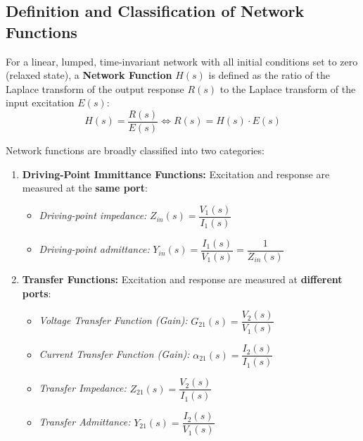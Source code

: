\documentclass[12pt,a4paper]{article}
\begin{document}
\subsection{Definition and Classification of Network Functions}

\begin{tcolorbox}[defbox, title={\textbf{Network Function Definition}}]
For a linear, lumped, time-invariant network with all initial conditions set to zero (relaxed state), a \textbf{Network Function} $H(s)$ is defined as the ratio of the Laplace transform of the output response $R(s)$ to the Laplace transform of the input excitation $E(s)$:
\begin{equation}
  H(s) = \frac{R(s)}{E(s)} \iff R(s) = H(s) \cdot E(s)
\end{equation}
\end{tcolorbox}

Network functions are broadly classified into two categories:
\begin{enumerate}[leftmargin=*]
  \item \textbf{Driving-Point Immittance Functions:} Excitation and response are measured at the \textbf{same port}:
  \begin{itemize}
    \item \textit{Driving-point impedance:} $Z_{in}(s) = \dfrac{V_1(s)}{I_1(s)}$
    \item \textit{Driving-point admittance:} $Y_{in}(s) = \dfrac{I_1(s)}{V_1(s)} = \dfrac{1}{Z_{in}(s)}$
  \end{itemize}
  \item \textbf{Transfer Functions:} Excitation and response are measured at \textbf{different ports}:
  \begin{itemize}
    \item \textit{Voltage Transfer Function (Gain):} $G_{21}(s) = \dfrac{V_2(s)}{V_1(s)}$
    \item \textit{Current Transfer Function (Gain):} $\alpha_{21}(s) = \dfrac{I_2(s)}{I_1(s)}$
    \item \textit{Transfer Impedance:} $Z_{21}(s) = \dfrac{V_2(s)}{I_1(s)}$
    \item \textit{Transfer Admittance:} $Y_{21}(s) = \dfrac{I_2(s)}{V_1(s)}$
  \end{itemize}
\end{enumerate}

\end{document}
